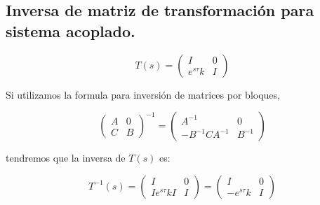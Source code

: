         \subsection*{Inversa de matriz de transformación para sistema acoplado.}

        \begin{equation}
            T(s) =
            \begin{pmatrix}
                I & 0 \\
                e^{s \tau}k & I
            \end{pmatrix}
        \end{equation}

        Si utilizamos la formula para inversión de matrices por bloques\cite{kailath1980linear},

        \begin{equation}
            \begin{pmatrix}
                A & 0 \\
                C & B
            \end{pmatrix}^{-1} =
            \begin{pmatrix}
                A^{-1} & 0 \\
                -B^{-1} C A^{-1} & B^{-1}
            \end{pmatrix}
        \end{equation}

        tendremos que la inversa de $T(s)$ es:

        \begin{equation*}
            T^{-1}(s) =
            \begin{pmatrix}
                I & 0 \\
                I e^{s \tau}k I & I
            \end{pmatrix} =
            \begin{pmatrix}
                I & 0 \\
                -e^{s \tau}k & I
            \end{pmatrix}
        \end{equation*}     

    
    

